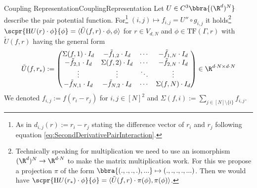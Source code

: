 \begin{mpos}{Coupling Representation}{CouplingRepresentation}
    Let $U\in C^3\bbra{(\R^d)^N}$ describe the pair potential function. For\footnote{As in $d_{i,j}(r) := r_i - r_j$ stating the difference vector of $r_i$ and $r_j$ following equation \eqref{eq:SecondDerivativePairInteraction}.} $(i,j)\mapsto f_{i,j} = U''\circ g_{i,j}$ it holds\footnote{Technically speaking for multiplication we need to use an isomorphism $(\R^d)^N\to\R^{d\cdot N}$ to make the matrix multiplication work. For this we propose a projection $\pi$ of the form $\bbra{(.,.,.,.),...}\mapsto (.,.,.,.,...)$. Then we would have $\scpr{\text{H}U(r_*)\cdot\phi}{\phi} = \langle\tilde U(f,r)\cdot\pi(\phi),\pi(\phi)\rangle$.} $\scpr{\text{H}U(r)\cdot\phi}{\phi} = \langle\tilde U(f,r)\cdot\phi,\phi\rangle$ for $r\in V_{d,N}$ and $\phi\in\text{TF}(\Gamma,r)$ with $\tilde U(f,r)$ having the general form
    \[
        \tilde U(f,r_*) := \begin{pmatrix}
            \Sigma(f,1)\cdot I_d & -\tilde f_{1,2}\cdot I_d & \cdots & -\tilde f_{1,N}\cdot I_d\\ 
            -\tilde f_{2,1}\cdot I_d & \Sigma(f,2)\cdot I_d & \cdots & -\tilde f_{2,N}\cdot I_d\\
            \vdots & \vdots & \ddots & \vdots\\
            -\tilde f_{N,1}\cdot I_d & -\tilde f_{N,2}\cdot I_d & \cdots & \Sigma(f,N)\cdot I_d
        \end{pmatrix}\in\R^{d\cdot N\times d\cdot N}
    \]
    We denoted $f_{i,j} := f(r_i-r_j)$ for $i,j\in[N]^2$ and $\Sigma(f,i) := \sum_{j\in[N]\setminus\{i\}}f_{i,j}$.
\end{mpos}
